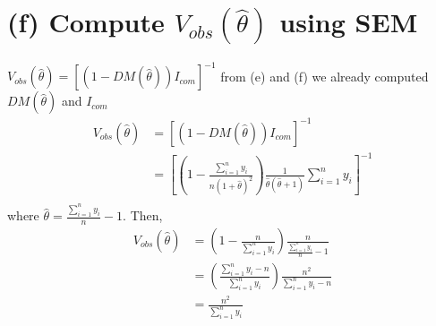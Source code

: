 \documentclass[11pt]{article}
\begin{document}
\section*{(f) Compute $V_{obs}(\hat{\theta})$ using SEM}
$V_{obs}(\hat{\theta}) = \left[(1-DM(\hat{\theta}))I_{com}\right]^{-1}$ from (e) and (f) we already computed $DM(\hat{\theta})$ and $I_{com}$
\begin{align*}
V_{obs}(\hat{\theta}) &= \left[(1-DM(\hat{\theta}))I_{com}\right]^{-1}\\
&=\left[\left(1-\frac{\sum_{i=1}^{n}y_i}{n(1+\hat{\theta})^2}\right) \frac{1}{\hat{\theta}(\hat{\theta} +1)}\sum_{i=1}^{n}y_i\right]^{-1}\\
\end{align*}
where $\hat{\theta} = \frac{\sum_{i=1}^{n}y_i}{n} - 1$. Then,
\begin{align*}
V_{obs}(\hat{\theta}) &=\left(1-\frac{n}{\sum_{i=1}^{n}y_i}\right)\frac{n}{\frac{\sum_{i=1}^{n}y_i}{n} -1}\\
&=\left(\frac{\sum_{i=1}^{n}y_i - n}{\sum_{i=1}^{n}y_i}\right)\frac{n^2}{\sum_{i=1}^{n}y_i -n}\\
&=\frac{n^2}{\sum_{i=1}^{n}y_i}
\end{align*}
\end{document}
